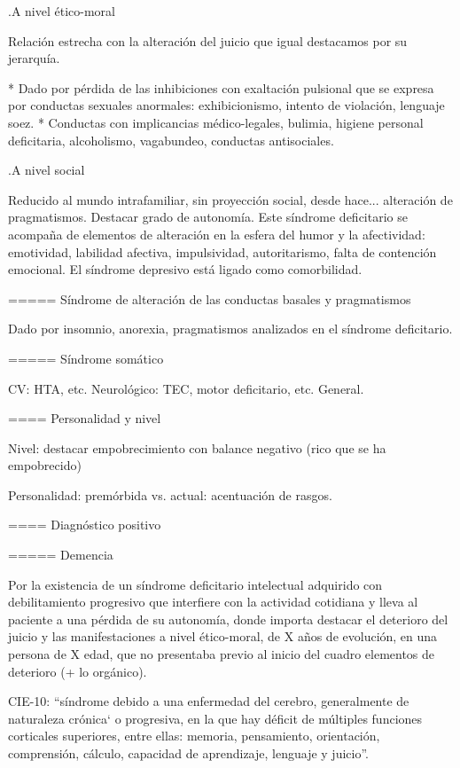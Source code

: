 \documentclass[encares.tex]{subfiles}
\begin{document}
.A nivel ético-moral

Relación estrecha con la alteración del juicio que igual destacamos por su jerarquía.

* Dado por pérdida de las inhibiciones con exaltación pulsional que se expresa por conductas sexuales anormales: exhibicionismo, intento de violación, lenguaje soez.
* Conductas con implicancias médico-legales, bulimia, higiene personal deficitaria, alcoholismo, vagabundeo, conductas antisociales.

.A nivel social

Reducido al mundo intrafamiliar, sin proyección social, desde hace... alteración de pragmatismos. Destacar grado de autonomía. Este síndrome deficitario se acompaña de elementos de alteración en la esfera del humor y la afectividad: emotividad, labilidad afectiva, impulsividad, autoritarismo, falta de contención emocional. El síndrome depresivo está ligado como comorbilidad.

===== Síndrome de alteración de las conductas basales y pragmatismos

Dado por insomnio, anorexia, pragmatismos analizados en el síndrome deficitario.

===== Síndrome somático

CV: HTA, etc. Neurológico: TEC, motor deficitario, etc. General.

==== Personalidad y nivel

Nivel: destacar empobrecimiento con balance negativo (rico que se ha empobrecido)

Personalidad: premórbida vs. actual: acentuación de rasgos.

==== Diagnóstico positivo

===== Demencia

Por la existencia de un síndrome deficitario intelectual adquirido con debilitamiento progresivo que interfiere con la actividad cotidiana y lleva al paciente a una pérdida de su autonomía, donde importa destacar el deterioro del juicio y las manifestaciones a nivel ético-moral, de X años de evolución, en una persona de X edad, que no presentaba previo al inicio del cuadro elementos de deterioro (+ lo orgánico).

CIE-10: “síndrome debido a una enfermedad del cerebro, generalmente de naturaleza crónica` o progresiva, en la que hay déficit de múltiples funciones corticales superiores, entre ellas: memoria, pensamiento, orientación, comprensión, cálculo, capacidad de aprendizaje, lenguaje y juicio”.
\end{document}
